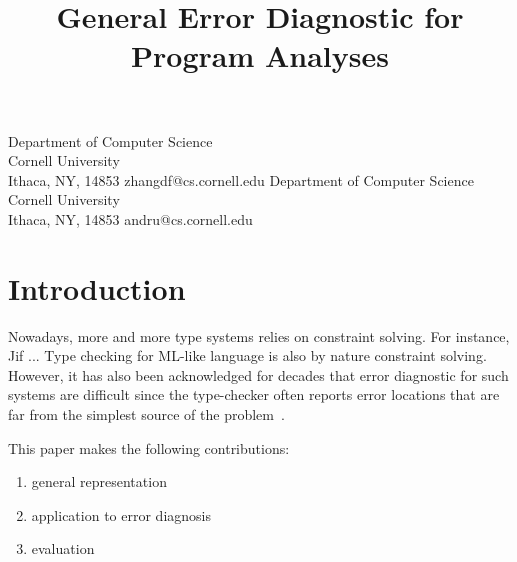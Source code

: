  
\usepackage{times,graphicx,color}
\usepackage{amsmath, amssymb, stmaryrd}
\usepackage{ttquot,utf8}
\usepackage[comments]{declarations}

\renewcommand{\floatpagefraction}{0.75}
\renewcommand{\dblfloatpagefraction}{0.75}

\title{General Error Diagnostic for Program Analyses}

\ifanonymous
\else
{}
           {Department of Computer Science\\ Cornell University\\ Ithaca, NY, 14853}
           {zhangdf@cs.cornell.edu}
           {Department of Computer Science\\ Cornell University\\ Ithaca, NY, 14853}
           {andru@cs.cornell.edu}
\fi


\maketitle

\begin{abstract}
\end{abstract}

\section{Introduction}

Nowadays, more and more type systems relies on constraint solving. For
instance, Jif ... Type checking for ML-like language is also by nature
constraint solving. However, it has also been acknowledged for
decades that error diagnostic for such systems are difficult
since the type-checker often reports error locations that are far from the
simplest source of the problem~\cite{wand-errorfinding}.


This paper makes the following contributions:

\begin{enumerate}
\item
general representation

\item
application to error diagnosis

\item
evaluation
\end{enumerate}

